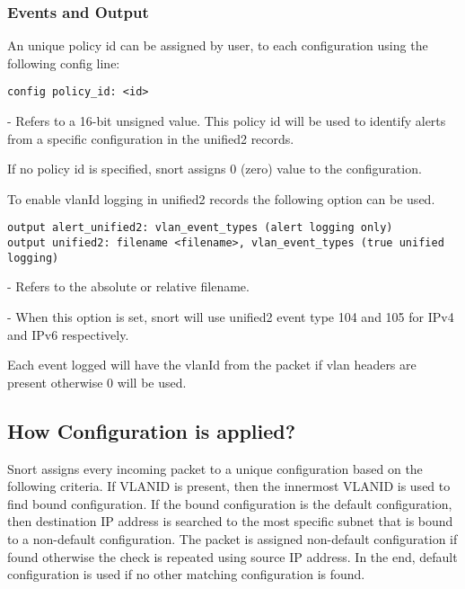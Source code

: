 \documentclass[english]{report}
\newenvironment{note}{
\samepage
    \vspace{10pt}{\textsf{
        {\hspace{7pt}\Huge{$\triangle$\hspace{-12.5pt}{\Large{$^!$}}}}\hspace{5pt}
        {\Large{NOTE}}
    }
    }
   \begin{center}
    \par\vspace{-17pt}

    \begin{lrbox}{\savepar}
    \begin{minipage}[r]{6in}
}
{
    \end{minipage}
    \end{lrbox}
    \fbox{
        \usebox{
            \savepar
	}
    }
    \par\vskip10pt
    \end{center}
}
\newenvironment{note}{
        \begin{rawhtml}
        <p><table border="1"><tr><td><b>
        Note:&nbsp;&nbsp;</b>
        \end{rawhtml}
}{
        \begin{rawhtml}
        </b></td></tr></table></p>
        \end{rawhtml}
}
\begin{document}
\subsubsection{Events and Output}
An unique policy id can be assigned by user, to each configuration using the following 
config line:

\begin{verbatim}
config policy_id: <id>
\end{verbatim}

\begin{description}{}
\item [\texttt{id}] - Refers to a 16-bit unsigned value. This policy id will be used to 
identify alerts from a specific configuration in the unified2 records.
\end{description}

\begin{note}
If no policy id is specified, snort assigns 0 (zero) value to the configuration.
\end{note}

To enable vlanId logging in unified2 records the following option can be used.

\begin{verbatim}
output alert_unified2: vlan_event_types (alert logging only)
output unified2: filename <filename>, vlan_event_types (true unified logging)
\end{verbatim}

\begin{description}{}
\item [\texttt{filename}] - Refers to the absolute or relative filename.
\item [\texttt{vlan\_event\_types}] - When this option is set, snort will use unified2 event 
type 104 and 105 for IPv4 and IPv6 respectively. 
\end{description}

\begin{note}
Each event logged will have the vlanId from the packet if vlan headers are present 
otherwise 0 will be used.
\end{note}

\subsection{How Configuration is applied?}
Snort assigns every incoming packet to a unique configuration based on the following criteria. 
If VLANID is present, then the innermost VLANID is used to find bound configuration. If the 
bound configuration is the default configuration, then destination IP address is searched to 
the most specific subnet that is bound to a non-default  configuration. The packet is assigned 
non-default configuration if found otherwise the check is repeated using source IP address. 
In the end, default configuration is used if no other matching configuration is found.
\end{document}
